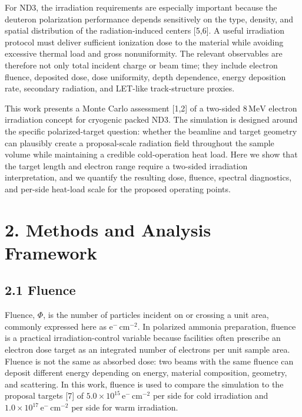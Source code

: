 \documentclass[
  12pt,
]{article}
\begin{document}
For ND3, the irradiation requirements are especially important because
the deuteron polarization performance depends sensitively on the type,
density, and spatial distribution of the radiation-induced centers
{[}5,6{]}. A useful irradiation protocol must deliver sufficient
ionization dose to the material while avoiding excessive thermal load
and gross nonuniformity. The relevant observables are therefore not only
total incident charge or beam time; they include electron fluence,
deposited dose, dose uniformity, depth dependence, energy deposition
rate, secondary radiation, and LET-like track-structure proxies.

This work presents a Monte Carlo assessment {[}1,2{]} of a two-sided
\(8\,\mathrm{MeV}\) electron irradiation concept for cryogenic packed
ND3. The simulation is designed around the specific polarized-target
question: whether the beamline and target geometry can plausibly create
a proposal-scale radiation field throughout the sample volume while
maintaining a credible cold-operation heat load. Here we show that the
target length and electron range require a two-sided irradiation
interpretation, and we quantify the resulting dose, fluence, spectral
diagnostics, and per-side heat-load scale for the proposed operating
points.

\hypertarget{methods-and-analysis-framework}{%
\section{2. Methods and Analysis
Framework}\label{methods-and-analysis-framework}}

\hypertarget{fluence}{%
\subsection{2.1 Fluence}\label{fluence}}

Fluence, \(\Phi\), is the number of particles incident on or crossing a
unit area, commonly expressed here as
\(\mathrm{e}^{-}\,\mathrm{cm}^{-2}\). In polarized ammonia preparation,
fluence is a practical irradiation-control variable because facilities
often prescribe an electron dose target as an integrated number of
electrons per unit sample area. Fluence is not the same as absorbed
dose: two beams with the same fluence can deposit different energy
depending on energy, material composition, geometry, and scattering. In
this work, fluence is used to compare the simulation to the proposal
targets {[}7{]} of
\(5.0 \times 10^{15}\,\mathrm{e}^{-}\,\mathrm{cm}^{-2}\) per side for
cold irradiation and
\(1.0 \times 10^{17}\,\mathrm{e}^{-}\,\mathrm{cm}^{-2}\) per side for
warm irradiation.
\end{document}
